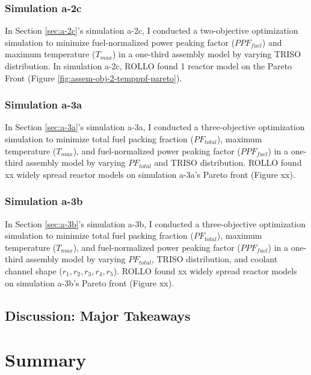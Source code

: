 
\subsubsection{Simulation a-2c}
In Section \ref{sec:a-2c}'s simulation a-2c, I conducted a two-objective 
optimization simulation to minimize fuel-normalized power peaking factor ($PPF_{fuel}$) 
and maximum temperature ($T_{max}$) in a one-third assembly model by varying 
TRISO distribution. 
In simulation a-2c, ROLLO found 1 reactor model on the Pareto Front (Figure 
\ref{fig:assem-obj-2-tempppf-pareto}). 

\subsubsection{Simulation a-3a}
In Section \ref{sec:a-3a}'s simulation a-3a, I conducted a three-objective 
optimization simulation to minimize total fuel packing fraction ($PF_{total}$), 
maximum temperature ($T_{max}$), and fuel-normalized power peaking factor 
($PPF_{fuel}$) in a one-third assembly model by varying $PF_{total}$ and 
TRISO distribution.
\gls{ROLLO} found xx widely spread reactor models on simulation a-3a's Pareto 
front (Figure xx). 

\subsubsection{Simulation a-3b}
In Section \ref{sec:a-3b}'s simulation a-3b, I conducted a three-objective 
optimization simulation to minimize total fuel packing fraction ($PF_{total}$), 
maximum temperature ($T_{max}$), and fuel-normalized power peaking factor 
($PPF_{fuel}$) in a one-third assembly model by varying $PF_{total}$, 
TRISO distribution, and coolant channel shape ($r_1, r_2, r_3, r_4, r_5$).
\gls{ROLLO} found xx widely spread reactor models on simulation a-3b's Pareto 
front (Figure xx). 

\subsection{Discussion: Major Takeaways}

\section{Summary}

